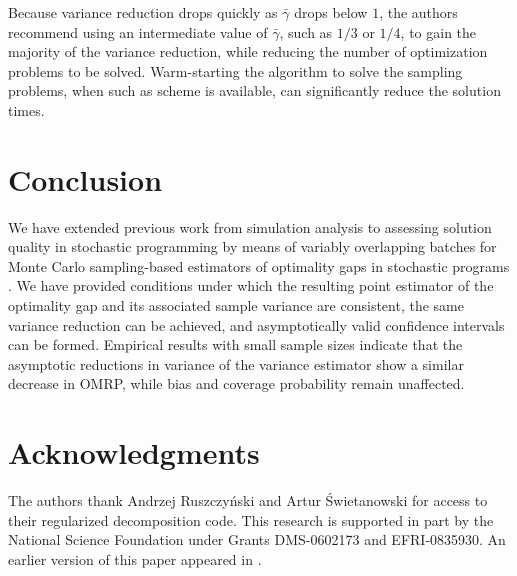 \documentclass[11pt]{article}
\newcommand{\gammab}{\bar{\gamma}}
\begin{document}
Because variance reduction drops quickly as $\gammab$ drops below $1$, the authors recommend using an intermediate value of $\gammab$, such as $1/3$ or $1/4$, to gain the majority of the variance reduction, while reducing the number of optimization problems to be solved. 
Warm-starting the algorithm to solve the sampling problems, when such as scheme is available, can significantly reduce the solution times.


\section{Conclusion} \label{sec:concl}
We have extended previous work from simulation analysis to assessing solution quality in stochastic programming by means of variably overlapping batches \cite{Meketon1984,Song1992,Welch1987} for Monte Carlo sampling-based estimators of optimality gaps in stochastic programs \cite{Mak1999}. 
We have provided conditions under which the resulting point estimator of the optimality gap and its associated sample variance are consistent, the same variance reduction can be achieved, and asymptotically valid confidence intervals can be formed. 
Empirical results with small sample sizes indicate that the asymptotic reductions in variance of the variance estimator show a similar decrease in OMRP, while bias and coverage probability remain unaffected. 


\section*{Acknowledgments}
The authors thank Andrzej Ruszczy{\'{n}}ski and Artur {\'{S}}wietanowski for
access to their regularized decomposition code. 
This research is supported
in part by the National Science Foundation under Grants DMS-0602173 and
EFRI-0835930.  
An earlier version of this paper appeared in \cite{love2011overlapping}.




 

\end{document}
